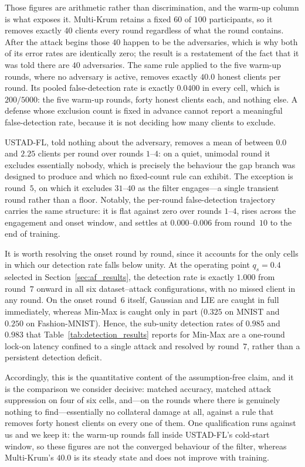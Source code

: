 \documentclass[journal]{IEEEtran}
\begin{document}
Those figures are arithmetic rather than discrimination, and the warm-up column is what
exposes it. Multi-Krum retains a fixed $60$ of $100$ participants, so it removes exactly $40$
clients every round regardless of what the round contains. After the attack begins those $40$
happen to be the adversaries, which is why both of its error rates are identically zero; the
result is a restatement of the fact that it was told there are $40$ adversaries. The same
rule applied to the five warm-up rounds, where no adversary is active, removes exactly $40.0$
honest clients per round. Its pooled false-detection rate is exactly $0.0400$ in every cell,
which is $200/5000$: the five warm-up rounds, forty honest clients each, and nothing else.
A defense whose exclusion count is fixed in advance cannot report a meaningful
false-detection rate, because it is not deciding how many clients to exclude.

USTAD-FL, told nothing about the adversary, removes a mean of between $0.0$ and $2.25$ clients
per round over rounds $1$--$4$: on a quiet, unimodal round it excludes essentially nobody,
which is precisely the behaviour the gap branch was designed to produce and which no
fixed-count rule can exhibit. The exception is round~$5$, on which it excludes $31$--$40$ as
the filter engages---a single transient round rather than a floor. Notably, the per-round
false-detection trajectory carries the same structure: it is flat against zero over rounds
$1$--$4$, rises across the engagement and onset window, and settles at $0.000$--$0.006$ from
round~$10$ to the end of training.

It is worth resolving the onset round by round, since it accounts for the only cells in which
our detection rate falls below unity. At the operating point $q_s = 0.4$ selected in
Section~\ref{sec:af_results}, the detection rate is exactly $1.000$ from round~$7$ onward in
all six dataset--attack configurations, with no missed client in any round. On the onset
round~$6$ itself, Gaussian and LIE are caught in full immediately, whereas Min-Max is caught
only in part ($0.325$ on MNIST and $0.250$ on Fashion-MNIST). Hence, the sub-unity detection
rates of $0.985$ and $0.983$ that Table~\ref{tab:detection_results} reports for Min-Max are a
one-round lock-on latency confined to a single attack and resolved by round~$7$, rather than a
persistent detection deficit.

Accordingly, this is the quantitative content of the assumption-free claim, and it is the
comparison we consider decisive: matched accuracy, matched attack suppression on four of six cells, and---on
the rounds where there is genuinely nothing to find---essentially no collateral damage at all,
against a rule that removes forty honest clients on every one of them. One qualification runs
against us and we keep it: the warm-up rounds fall inside USTAD-FL's cold-start window, so
these figures are not the converged behaviour of the filter, whereas Multi-Krum's $40.0$ is
its steady state and does not improve with training.
\end{document}
